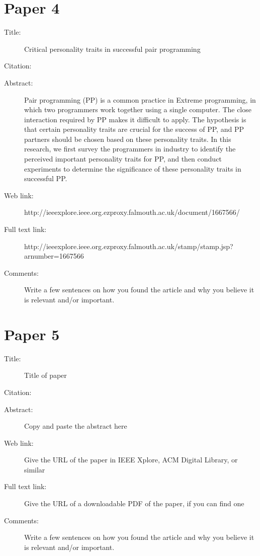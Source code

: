 \documentclass{scrartcl}
\begin{document}
\section*{Paper 4}
\begin{description}
\item[Title:] {Critical personality traits in successful pair programming}
\item[Citation:] \cite{Paper4}
\item[Abstract:]{ Pair programming (PP) is a common practice in Extreme programming, in which two programmers work together using a single computer. The close interaction required by PP makes it difficult to apply. The hypothesis is that certain personality traits are crucial for the success of PP, and PP partners should be chosen based on these personality traits. In this research, we first survey the programmers in industry to identify the perceived important personality traits for PP, and then conduct experiments to determine the significance of these personality traits in successful PP.}
\item[Web link:] {http://ieeexplore.ieee.org.ezproxy.falmouth.ac.uk/document/1667566/}
\item[Full text link:] {http://ieeexplore.ieee.org.ezproxy.falmouth.ac.uk/stamp/stamp.jsp?arnumber=1667566}
\item[Comments:] Write a few sentences on how you found the article and why you believe it is relevant and/or important.
\end{description}

\section*{Paper 5}
\begin{description}
\item[Title:] Title of paper
\item[Citation:] \cite{bibtex_key}
\item[Abstract:] Copy and paste the abstract here
\item[Web link:] Give the URL of the paper in IEEE Xplore, ACM Digital Library, or similar
\item[Full text link:] Give the URL of a downloadable PDF of the paper, if you can find one
\item[Comments:] Write a few sentences on how you found the article and why you believe it is relevant and/or important.
\end{description}



\end{document}
